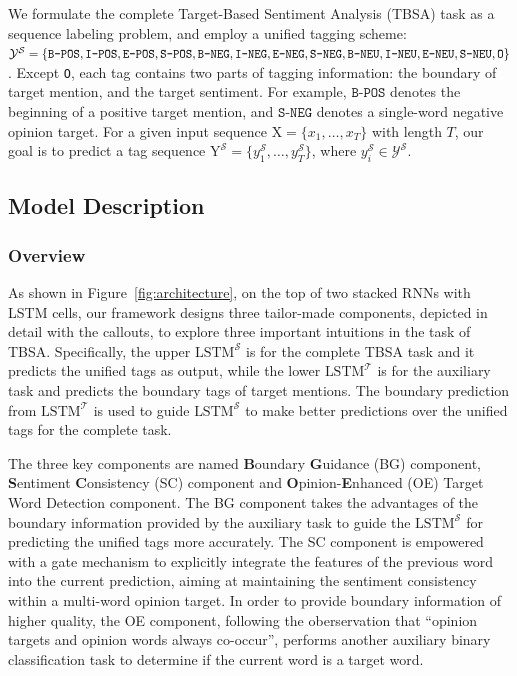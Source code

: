 \documentclass[letterpaper]{article} %
\begin{document}
We formulate the complete Target-Based Sentiment Analysis (TBSA) task as a sequence labeling problem, and employ a unified tagging scheme: $\mathcal{Y}^{\mathcal{S}} = \{\texttt{B-POS},\texttt{I-POS},\texttt{E-POS}, \texttt{S-POS}, \texttt{B-NEG},\texttt{I-NEG},\texttt{E-NEG},\\ \texttt{S-NEG}, \texttt{B-NEU},\texttt{I-NEU},\texttt{E-NEU}, \texttt{S-NEU}, \texttt{O}\}$. 
Except \texttt{O}, each tag contains two parts of tagging information: the boundary of target mention, and the target sentiment. For example, $\texttt{B-POS}$ denotes the beginning of a positive target mention, and $\texttt{S-NEG}$ denotes a single-word negative opinion target. 
For a given input sequence $\mathrm{ X}=\{x_1,\dots,x_T\}$ with length $T$, our goal is to predict a tag sequence $\mathrm{ Y}^{\mathcal{S}}=\{y^{\mathcal{S}}_1,\dots,y^{\mathcal{S}}_T\}$, where $y^{\mathcal{S}}_i \in \mathcal{Y}^{\mathcal{S}}$.


\subsection{Model Description}
\subsubsection{Overview}
As shown in Figure~\ref{fig:architecture}, on the top of two stacked RNNs with LSTM cells, our framework designs three tailor-made components, depicted in detail with the callouts, to explore three important intuitions in the task of TBSA. 
Specifically, the upper $\text{LSTM}^{\mathcal{S}}$ is for the complete TBSA task and it predicts the unified tags as output, while the lower $\text{LSTM}^{\mathcal{T}}$ is for the auxiliary task and predicts the boundary tags of target mentions. The boundary prediction from $\text{LSTM}^{\mathcal{T}}$ is used to guide $\text{LSTM}^{\mathcal{S}}$ to make better predictions over the unified tags for the complete task. 


The three key components are named \textbf{B}oundary \textbf{G}uidance (BG) component, \textbf{S}entiment \textbf{C}onsistency (SC) component and \textbf{O}pinion-\textbf{E}nhanced (OE) Target Word Detection component. The BG component takes the advantages of the boundary information provided by the auxiliary task to guide the $\text{LSTM}^{\mathcal{S}}$ for predicting the unified tags more accurately. The SC component is empowered with a gate mechanism to explicitly integrate the features of the previous word into the current prediction, aiming at maintaining the sentiment consistency within a multi-word opinion target. In order to provide boundary information of higher quality, the OE component, following the oberservation that ``opinion targets and opinion words always co-occur'', performs another auxiliary binary classification task to determine if the current word is a target word.
\end{document}
